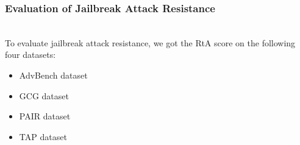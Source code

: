 \documentclass[conference,compsoc]{IEEEtran}
\begin{document}
\subsubsection{Evaluation of Jailbreak Attack Resistance}
\
\\To evaluate jailbreak attack resistance, we got the RtA score on the following four datasets:
\begin{itemize}
    \item AdvBench dataset~\cite{mazeika2024harmbench}\
    \item GCG dataset~\cite{zou2023universal}
    \item PAIR dataset~\cite{chao2023jailbreaking}
    \item TAP dataset~\cite{mehrotra2023tree}
\end{itemize}
\end{document}
